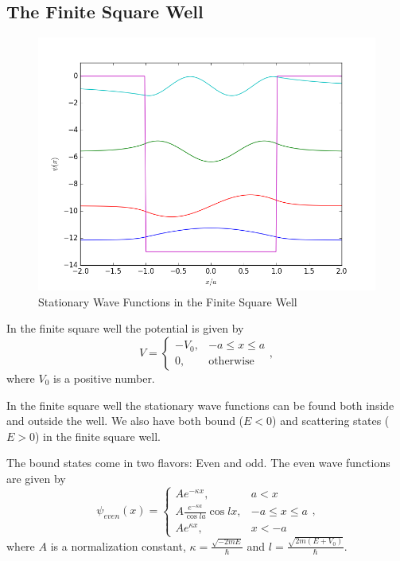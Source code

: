 \documentclass[12pt,a4paper]{article}
\begin{document}
\subsection{The Finite Square Well}
\begin{figure}
\includegraphics[width=\textwidth]{../Python/FSW_boundStates.png}
\caption{Stationary Wave Functions in the Finite Square Well}
\label{fig:finiteSquareWell}
\end{figure}

In the finite square well the potential is given by
\begin{equation}
V = \begin{cases} -V_0, & -a \leq x \leq a \\
                  0, & \text{otherwise} \end{cases},
\end{equation}
where $V_0$ is a positive number.

In the finite square well the stationary wave functions can be found both inside and outside the well. We also have both bound ($E < 0$) and scattering states ($E > 0$) in the finite square well.

The bound states come in two flavors: Even and odd. The even wave functions are given by
\begin{equation}
\psi_{even} (x) = \begin{cases} A e^{- \kappa x}, & a < x \\
                                A \frac{e^{- \kappa a}}{\cos la} \cos l x, & -a \leq x \leq a \\
                                A e^{\kappa x}, & x < -a \end{cases},
\end{equation}
where $A$ is a normalization constant, $\kappa = \frac{\sqrt{-2 m E}}{\hbar}$ and $l = \frac{\sqrt{2 m (E + V_0)}}{\hbar}$.
\end{document}
